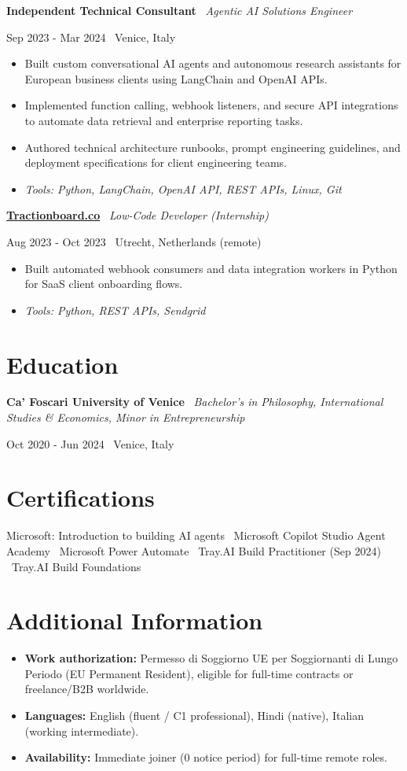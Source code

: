 \documentclass[a4paper,10pt]{article}
\newcommand{\role}[4]{%
  \vspace{2pt}\noindent
  \begin{minipage}[t]{0.70\textwidth}\raggedright\textbf{#1} \textbullet\ \textit{#3}\end{minipage}%
  \hfill
  \begin{minipage}[t]{0.28\textwidth}\raggedleft\footnotesize\color{gray}#2 \textbullet\ #4\end{minipage}%
  \vspace{1pt}%
}
\begin{document}
\role{Independent Technical Consultant}{Sep 2023 - Mar 2024}{Agentic AI Solutions Engineer}{Venice, Italy}
\begin{itemize}
  \item Built custom conversational AI agents and autonomous research assistants for European business clients using LangChain and OpenAI APIs.
  \item Implemented function calling, webhook listeners, and secure API integrations to automate data retrieval and enterprise reporting tasks.
  \item Authored technical architecture runbooks, prompt engineering guidelines, and deployment specifications for client engineering teams.
  \item \textit{Tools: Python, LangChain, OpenAI API, REST APIs, Linux, Git}
\end{itemize}

\role{\href{https://tractionboard.co}{Tractionboard.co}}{Aug 2023 - Oct 2023}{Low-Code Developer (Internship)}{Utrecht, Netherlands (remote)}
\begin{itemize}
  \item Built automated webhook consumers and data integration workers in Python for SaaS client onboarding flows.
  \item \textit{Tools: Python, REST APIs, Sendgrid}
\end{itemize}

\section{Education}
\role{Ca' Foscari University of Venice}{Oct 2020 - Jun 2024}{Bachelor's in Philosophy, International Studies \& Economics, Minor in Entrepreneurship}{Venice, Italy}

\section{Certifications}
Microsoft: Introduction to building AI agents \textbullet\ Microsoft Copilot Studio Agent Academy \textbullet\ Microsoft Power Automate \textbullet\ Tray.AI Build Practitioner (Sep 2024) \textbullet\ Tray.AI Build Foundations

\section{Additional Information}
\begin{itemize}
  \item \textbf{Work authorization:} Permesso di Soggiorno UE per Soggiornanti di Lungo Periodo (EU Permanent Resident), eligible for full-time contracts or freelance/B2B worldwide.
  \item \textbf{Languages:} English (fluent / C1 professional), Hindi (native), Italian (working intermediate).
  \item \textbf{Availability:} Immediate joiner (0 notice period) for full-time remote roles.
\end{itemize}
\end{document}
